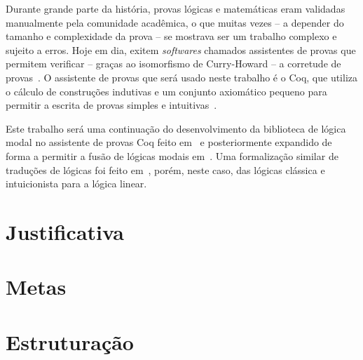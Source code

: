 Durante grande parte da história, provas lógicas e matemáticas eram validadas manualmente pela comunidade acadêmica, o que muitas vezes -- a depender do tamanho e complexidade da prova -- se mostrava ser um trabalho complexo e sujeito a erros. Hoje em dia, exitem \textit{softwares} chamados assistentes de provas que permitem verificar -- graças ao isomorfismo de Curry-Howard -- a corretude de provas~\cite{Chlipala}. O assistente de provas que será usado neste trabalho é o Coq, que utiliza o cálculo de construções indutivas e um conjunto axiomático pequeno para permitir a escrita de provas simples e intuitivas~\cite{Barras}.

Este trabalho será uma continuação do desenvolvimento da biblioteca de lógica modal no assistente de provas Coq feito em~\cite{Silveira} e posteriormente expandido de forma a permitir a fusão de lógicas modais em~\cite{Nunes}. Uma formalização similar de traduções de lógicas foi feito em~\cite{Sehnem}, porém, neste caso, das lógicas clássica e intuicionista para a lógica linear.

    \section{Justificativa}
    \section{Metas}
    \section{Estruturação}